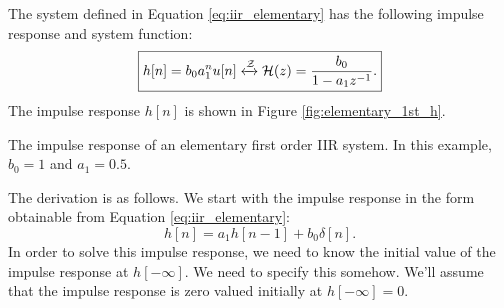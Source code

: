 The system defined in Equation \ref{eq:iir_elementary} has the
following impulse response and system function:
\begin{equation}
    \boxed{
        h[n] = b_0 a_1^n u[n] \xleftrightarrow{\mathcal{Z}} \mathcal{H}(z) = \frac{b_0}{1-a_1 z^{-1}}.
    }
\end{equation}
The impulse response $h[n]$ is shown in Figure \ref{fig:elementary_1st_h}.
\begin{marginfigure}
    \begin{center}
    \end{center}
    \caption{The impulse response of an elementary first order IIR system. In this example, $b_0=1$ and $a_1=0.5$.}
    \label{fig:elementary_1st_h}
\end{marginfigure}

The derivation is as follows. We start with the impulse response in
the form obtainable from Equation \ref{eq:iir_elementary}:
\begin{equation}
    h[n] = a_1 h[n-1] + b_0 \delta[n].
\end{equation}
In order to solve this impulse response, we need to know the
initial value of the impulse response at $h[-\infty]$. We need to
specify this \emph{}
somehow. We'll assume that the impulse response is zero valued
initially at $h[-\infty]=0$.

